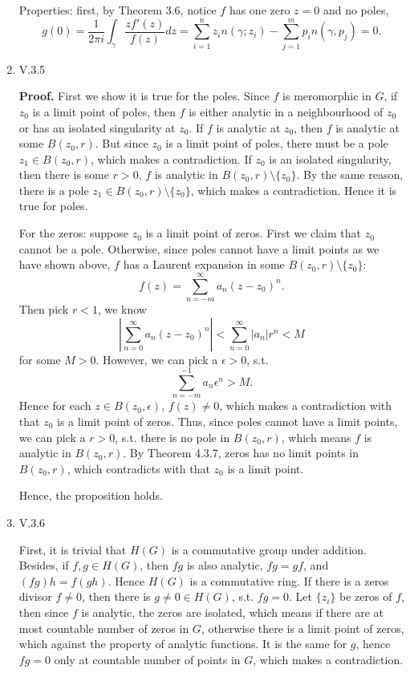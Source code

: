 \documentclass{article}%
\begin{document}
\begin{enumerate}
Properties: first, by Theorem 3.6, notice $f$ has one zero $z = 0$ and no poles,
$$
g(0) = \frac{1}{2\pi i}\int_{\gamma}\frac{zf'(z)}{f(z)}dz = \sum_{i=1}^{n}z_i n(\gamma; z_i) - \sum_{j=1}^{m}p_i n(\gamma, p_j) = 0.
$$

\item V.3.5

\textbf{Proof.}
First we show it is true for the poles. Since $f$ is meromorphic in $G$, if $z_0 $ is a limit point of poles, then $f$ is either analytic in a neighbourhood of $z_0 $ or has an isolated singularity at $z_0 $. If $f$ is analytic at $z_0 $, then $f$ is analytic at some $B(z_0, r)$. But since $z_0 $ is a limit point of poles, there must be a pole $z_1\in B(z_0, r)$, which makes a contradiction. If $z_0 $ is an isolated singularity, then there is some $r > 0$, $f$ is analytic in $B(z_0, r)\setminus\{z_0\}$. By the same reason, there is a pole $z_1\in B(z_0, r)\setminus\{z_0\}$, which makes a contradiction. Hence it is true for poles.

For the zeros: suppose $z_0 $ is a limit point of zeros. First we claim that $z_0 $ cannot be a pole. Otherwise, since poles cannot have a limit points as we have shown above, $f$ has a Laurent expansion in some $B(z_0, r)\setminus\{z_0\}$:
$$
f(z) = \sum_{n=-m}^{\infty}a_n(z-z_0)^n.
$$
Then pick $r < 1$, we know
$$
\left|\sum_{n=0}^{\infty}a_n (z-z_0)^n\right| < \sum_{n=0}^{\infty}|a_n|r^n < M
$$
for some $M > 0$. However, we can pick a $\epsilon > 0$, s.t. 
$$
\sum_{n=-m}^{-1}a_n\epsilon^n > M.
$$
Hence for each $z\in B(z_0, \epsilon)$, $f(z)\ne 0$, which makes a contradiction with that $z_0 $ is a limit point of zeros. Thus, since poles cannot have a limit points, we can pick a $r > 0$, s.t. there is no pole in $B(z_0, r)$, which means $f$ is analytic in $B(z_0, r)$. By Theorem 4.3.7, zeros has no limit points in $B(z_0, r)$, which contradicts with that $z_0 $ is a limit point.

Hence, the proposition holds.

\item V.3.6

First, it is trivial that $H(G)$ is a commutative group under addition. Besides, if $f, g\in H(G)$, then $fg$ is also analytic, $fg = gf$, and $(fg)h = f(gh)$. Hence $H(G)$ is a commutative ring. If there is a zeros divisor $f\ne 0$, then there is $g\ne 0\in H(G)$, s.t. $fg = 0$. Let $\{z_i\}$ be zeros of $f$, then since $f$ is analytic, the zeros are isolated, which means if there are at most countable number of zeros in $G$, otherwise there is a limit point of zeros, which against the property of analytic functions. It is the same for $g$, hence $fg = 0$ only at countable number of points in $G$, which makes a contradiction.


\end{enumerate}
\end{document}
